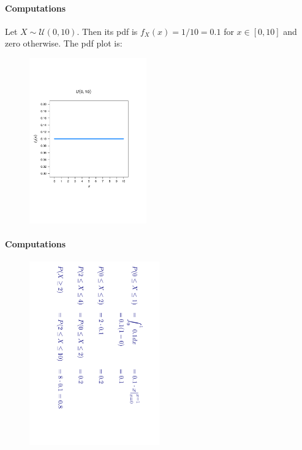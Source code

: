\documentclass[notes=show,smaller]{beamer}\usepackage[]{graphicx}\usepackage[]{color}
\begin{document}
\begin{frame}{\subsecname}
  \framesubtitle{Computations}
  \begin{example}
  Let $X \sim \mathcal{U}(0,10)$. Then its pdf is $f_X(x) = 1/10=0.1$ for $x\in[0,10]$ and zero otherwise. The pdf plot is:

  \begin{figure}[ptb]\centering
  \includegraphics[width=0.45\textwidth,height=0.65\textheight]{img/Unif_Diego.pdf}%
  \end{figure}

  \end{example}
\end{frame}

\begin{frame}{\subsecname}
  \framesubtitle{Computations}

  \begin{example}[continued]


  \begin{figure}[ptb]\centering
  \includegraphics[width=0.5\textwidth,height=0.9\textheight, angle= 90]{img/Unif_Diego_Calc.pdf}%
  \end{figure}
  \end{example}
\end{frame}
\end{document}
